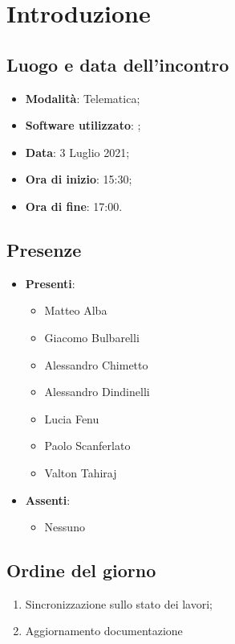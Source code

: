 \documentclass[]{article}
\begin{document}
	

	\newpage


		\section{Introduzione}
		\subsection{Luogo e data dell'incontro}
		\begin{itemize}
			\item \textbf{Modalità}: Telematica;
			\item \textbf{Software utilizzato}: ;
			\item \textbf{Data}: 3 Luglio 2021;
			\item \textbf{Ora di inizio}: 15:30;
			\item \textbf{Ora di fine}: 17:00.
		\end{itemize}

		\subsection{Presenze}
		\begin{itemize}
			\item \textbf{Presenti}:
			\begin{itemize}
				\item Matteo Alba
				\item Giacomo Bulbarelli
				\item Alessandro Chimetto
				\item Alessandro Dindinelli
				\item Lucia Fenu
				\item Paolo Scanferlato
				\item Valton Tahiraj
			\end{itemize}
			\item \textbf{Assenti}:
			\begin{itemize}
				\item Nessuno
			\end{itemize}
		\end{itemize}


		\subsection{Ordine del giorno}
		\begin{enumerate}
			\item Sincronizzazione sullo stato dei lavori;
			\item Aggiornamento documentazione
		\end{enumerate}
\end{document}
